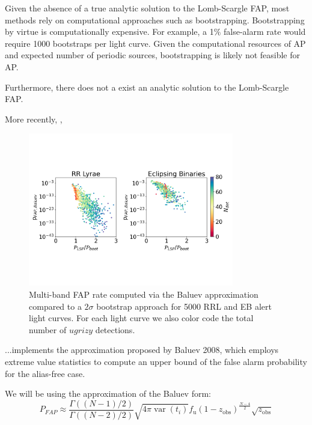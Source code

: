 \documentclass[DM,authoryear,toc]{lsstdoc}
\begin{document}
Given the absence of a true analytic solution to the Lomb-Scargle FAP, most methods rely on computational approaches such as bootstrapping. Bootstrapping by virtue is computationally expensive. For example, a 1$\%$ false-alarm rate would require 1000 bootstraps per light curve. Given the computational resources of AP and expected number of periodic sources, bootstrapping is likely not feasible for AP.

Furthermore, there does not a exist an analytic solution to the Lomb-Scargle FAP.


 More recently, \citet{Baluev:Baluev2008}, 

\begin{figure}
  \includegraphics[width=0.8\textwidth]{figures/fap_approximation_mlsp.pdf}
  \centering 
  \caption{Multi-band FAP rate computed via the Baluev approximation compared to a $2\sigma$ bootstrap approach for 5000 RRL and EB alert light curves. For each light curve we also color code the total number of $ugrizy$ detections.}
\end{figure}




...implements the approximation proposed by Baluev 2008, which employs extreme value statistics to compute an upper bound of the false alarm probability for the alias-free case.



We will be using the approximation of the Baluev form:
\begin{equation}
P_{FAP} \approx \frac{\Gamma((N-1) / 2)}{\Gamma((N-2) / 2)} \sqrt{4 \pi \operatorname{var}\left(t_i\right)} f_{\mathrm{u}}\left(1-z_{\mathrm{obs}}\right)^{\frac{N-4}{2}} \sqrt{z_{\mathrm{obs}}}
\end{equation}
\end{document}
